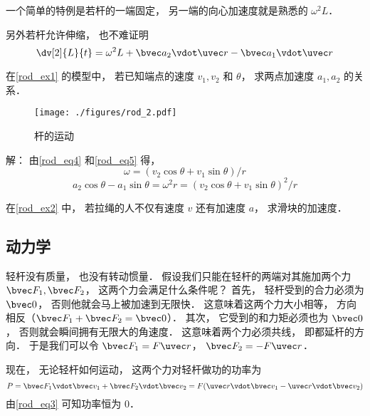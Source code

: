 一个简单的特例是若杆的一端固定， 另一端的向心加速度就是熟悉的 $\omega^2L$．

另外若杆允许伸缩， 也不难证明
\begin{equation}
\dv[2]{L}{t} = \omega^2 L + \bvec a_2 \vdot \uvec r - \bvec a_1 \vdot \uvec r
\end{equation}


\begin{example}{}
在\autoref{rod_ex1} 的模型中， 若已知端点的速度 $v_1, v_2$ 和 $\theta$， 求两点加速度 $a_1, a_2$ 的关系．
\begin{figure}[ht]
\centering
\texttt{[image: ./figures/rod\_2.pdf]}
\caption{杆的运动} \label{rod_fig2}
\end{figure}

解： 由\autoref{rod_eq4} 和\autoref{rod_eq5} 得，
\begin{equation}
\omega = (v_2 \cos\theta + v_1 \sin\theta)/r
\end{equation}
\begin{equation}
a_2 \cos\theta - a_1 \sin\theta = \omega^2 r = (v_2 \cos\theta + v_1 \sin\theta)^2/r
\end{equation}
\end{example}

\begin{exercise}{}
在\autoref{rod_ex2} 中， 若拉绳的人不仅有速度 $v$ 还有加速度 $a$， 求滑块的加速度．
\end{exercise}

\subsection{动力学}
轻杆没有质量， 也没有转动惯量． 假设我们只能在轻杆的两端对其施加两个力 $\bvec F_1, \bvec F_2$， 这两个力会满足什么条件呢？ 首先， 轻杆受到的合力必须为 $\bvec 0$， 否则他就会马上被加速到无限快． 这意味着这两个力大小相等， 方向相反（$\bvec F_1 + \bvec F_2 = \bvec 0$）． 其次， 它受到的和力矩必须也为 $\bvec 0$， 否则就会瞬间拥有无限大的角速度． 这意味着两个力必须共线， 即都延杆的方向． 于是我们可以令 $\bvec F_1 = F \uvec r$， $\bvec F_2 = -F \uvec r$．

现在， 无论轻杆如何运动， 这两个力对轻杆做功的功率为
\begin{equation}
P = \bvec F_1 \vdot \bvec v_1 + \bvec F_2 \vdot \bvec v_2 = F (\uvec r \vdot \bvec v_1 - \uvec r \vdot \bvec v_2)
\end{equation}
由\autoref{rod_eq3} 可知功率恒为 0．
